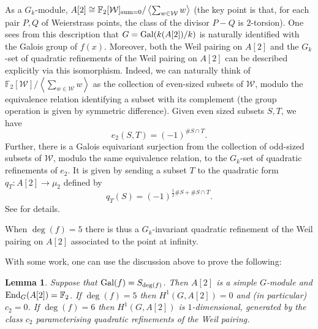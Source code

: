 \documentclass[10pt]{amsart}
\numberwithin{equation}{section}
\newtheorem{lemma}[equation]{Lemma}
\theoremstyle{remark}
\theoremstyle{definition}
\theoremstyle{definition}
\theoremstyle{definition}
\theoremstyle{definition}
\theoremstyle{definition}
\theoremstyle{definition}
\theoremstyle{definition}
\theoremstyle{definition}
\begin{document}
As a $G_k$-module, $A[2]\cong \mathbb{F}_2[\mathcal{W}]_{\textup{sum}=0}/\left \langle \sum_{w\in \mathcal{W}}w\right \rangle$ (the key point is that, for each pair $P, Q$ of Weierstrass points, the class of the divisor $P-Q$ is $2$-torsion).   One sees from this description that $G=\textup{Gal}(k(A[2])/k)$ is naturally identified with the Galois group of $f(x)$. Moreover, both the Weil pairing on $A[2]$ and the $G_k$-set of quadratic refinements of the Weil pairing on $A[2]$ can be described explicitly via this isomorphism. Indeed, we can naturally think of $\mathbb{F}_2[\mathcal{W}]/\left \langle \sum_{w\in \mathcal{W}}w\right \rangle$ as the collection of even-sized subsets of $\mathcal{W}$, modulo the equivalence relation identifying a subset with its complement (the group operation is given by symmetric difference). Given even sized subsets $S, T$, we have
\[e_2(S,T)=(-1)^{\#S\cap T}.\]
Further, there is a Galois equivariant surjection from the collection of odd-sized subsets of $\mathcal{W}$, modulo the same equivalence relation, to the $G_k$-set of quadratic refinements of $e_2$. It is given by sending a subset $T$ to the quadratic form $q_T:A[2]\to \mu_2$ defined by
\[q_T(S)=(-1)^{\tfrac{1}{2}\#S+\#S\cap T}.\]
See \cite[Section 5.2.3]{Dol12} for details. 



When $\deg(f)=5$ there is thus a $G_k$-invariant quadratic refinement of the Weil pairing on $A[2]$ associated to the point at infinity. 

With some work, one can use the discussion above to prove the following: 

\begin{lemma} \label{hyperelliptic_twisting_nonsense} 
Suppose that $\textup{Gal}(f)=S_{\textup{deg}(f)}$. Then $A[2]$ is a simple $G$-module and $\textup{End}_G(A[2])=\mathbb{F}_2$. If $\deg(f)=5$ then $H^1(G,A[2])=0$ and (in particular) $c_2=0$. If $\deg(f)=6$ then $H^1(G,A[2])$ is $1$-dimensional, generated by the class $c_2$ parameterising quadratic refinements of the Weil pairing. 
\end{lemma}


 
\end{document}

